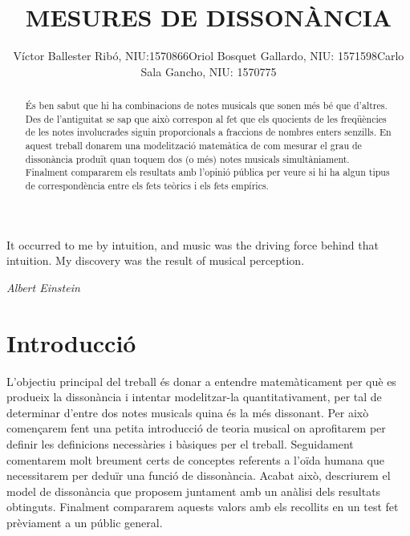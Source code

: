 \documentclass{article}
\title{\bfseries\large MESURES DE DISSONÀNCIA}
\author{Víctor Ballester Ribó, NIU:1570866\endgraf Oriol Bosquet Gallardo, NIU: 1571598\endgraf Carlo Sala Gancho, NIU: 1570775}
\date{\parbox{\linewidth}{\centering
  Taller de modelització\endgraf
  Grau en Matemàtiques\endgraf
  Universitat Autònoma de Barcelona\endgraf
  Juny de 2021}}
\theoremstyle{math}
\theoremstyle{TheoremNum}
\newcommand{\0}{\ensuremath{\vb{0}}}
\begin{document}
\maketitle
{}
\begin{abstract}
    És ben sabut que hi ha combinacions de notes musicals que sonen més bé que d'altres. Des de l'antiguitat se sap que això correspon al fet que els quocients de les freqüències de les notes involucrades siguin proporcionals a fraccions de nombres enters senzills. En aquest treball donarem una modelització matemàtica de com mesurar el grau de dissonància produït quan toquem dos (o més) notes musicals simultàniament. Finalment compararem els resultats amb l'opinió pública per veure si hi ha algun tipus de correspondència entre els fets teòrics i els fets empírics. 
\end{abstract}
\thispagestyle{empty}
\newpage
\thispagestyle{empty}
\vspace*{\fill}
\vspace{-2cm}
\epigraph{It occurred to me by intuition, and music was the driving force behind that intuition. My discovery was the result of musical perception.}{\textit{Albert Einstein}}
\vspace*{\fill}
\newpage
{}
\setcounter{page}{1}
\tableofcontents
\newpage
\section{Introducció}
L'objectiu principal del treball és donar a entendre matemàticament per què es produeix la dissonància i intentar modelitzar-la quantitativament, per tal de determinar d'entre dos notes musicals quina és la més dissonant. Per això començarem fent una petita introducció de teoria musical on aprofitarem per definir les definicions necessàries i bàsiques per el treball. Seguidament comentarem molt breument certs de conceptes referents a l'oïda humana que necessitarem per deduïr una funció de dissonància. Acabat això, descriurem el model de dissonància que proposem juntament amb un anàlisi dels resultats obtinguts. Finalment compararem aquests valors amb els recollits en un test fet prèviament a un públic general.
\end{document}
